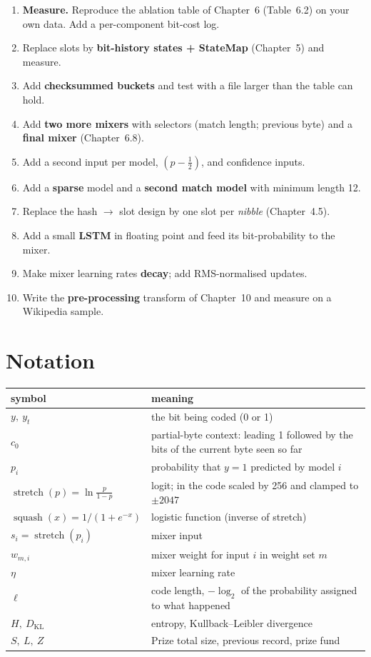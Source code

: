 \documentclass[11pt,a4paper,openany]{book}
\newcommand{\st}{\operatorname{stretch}}
\newcommand{\sq}{\operatorname{squash}}
\newcommand{\KL}{D_{\mathrm{KL}}}
\theoremstyle{definition}
\theoremstyle{remark}
\begin{document}
\begin{enumerate}
\item \textbf{Measure.} Reproduce the ablation table of Chapter~6 (Table~6.2) on your own data. Add a per-component bit-cost log.
\item Replace slots by \textbf{bit-history states + StateMap} (Chapter~5) and measure.
\item Add \textbf{checksummed buckets} and test with a file larger than the table can hold.
\item Add \textbf{two more mixers} with selectors (match length; previous byte) and a \textbf{final mixer} (Chapter~6.8).
\item Add a second input per model, $(p-\tfrac12)$, and confidence inputs.
\item Add a \textbf{sparse} model and a \textbf{second match model} with minimum length 12.
\item Replace the hash $\to$ slot design by one slot per \emph{nibble} (Chapter~4.5).
\item Add a small \textbf{LSTM} in floating point and feed its bit-probability to the mixer.
\item Make mixer learning rates \textbf{decay}; add RMS-normalised updates.
\item Write the \textbf{pre-processing} transform of Chapter~10 and measure on a Wikipedia sample.
\end{enumerate}

\chapter{Notation}

\begin{center}
\begin{tabular}{@{}lp{11cm}@{}}
\toprule
symbol & meaning\\
\midrule
$y,\ y_t$ & the bit being coded (0 or 1)\\
$c_0$ & partial-byte context: leading 1 followed by the bits of the current byte seen so far\\
$p_i$ & probability that $y=1$ predicted by model $i$\\
$\st(p)=\ln\frac p{1-p}$ & logit; in the code scaled by 256 and clamped to $\pm2047$\\
$\sq(x)=1/(1+e^{-x})$ & logistic function (inverse of stretch)\\
$s_i=\st(p_i)$ & mixer input\\
$w_{m,i}$ & mixer weight for input $i$ in weight set $m$\\
$\eta$ & mixer learning rate\\
$\ell$ & code length, $-\log_2$ of the probability assigned to what happened\\
$H,\ \KL$ & entropy, Kullback--Leibler divergence\\
$S,\ L,\ Z$ & Prize total size, previous record, prize fund\\
\bottomrule
\end{tabular}
\end{center}
\end{document}
